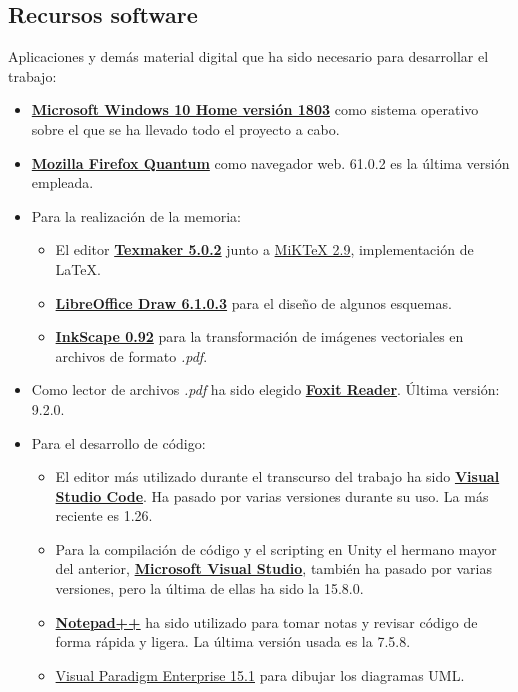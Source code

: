\subsection{Recursos software}
Aplicaciones y demás material digital que ha sido necesario para desarrollar el trabajo:
\begin{itemize}
\item \href{https://www.microsoft.com/es-es/windows}{\textbf{Microsoft Windows 10 Home versión 1803}} como sistema operativo sobre el que se ha llevado todo el proyecto a cabo.
\item \href{https://www.mozilla.org/es-ES/firefox/}{\textbf{Mozilla Firefox Quantum}} como navegador web. 61.0.2 es la última versión empleada.
\item Para la realización de la memoria:
\begin{itemize}
\item El editor \href{http://www.xm1math.net/texmaker/}{\textbf{Texmaker 5.0.2}} junto a \href{https://miktex.org/about}{MiKTeX 2.9}, implementación de \LaTeX.
\item \href{https://es.libreoffice.org/descubre/draw/}{\textbf{LibreOffice Draw 6.1.0.3}} para el diseño de algunos esquemas.
\item \href{https://inkscape.org/es/}{\textbf{InkScape 0.92}} para la transformación de imágenes vectoriales en archivos de formato \textit{.pdf}.
\end{itemize}
\item Como lector de archivos \textit{.pdf} ha sido elegido \href{https://www.foxitsoftware.com/pdf-reader/}{\textbf{Foxit Reader}}. Última versión: 9.2.0.
\item Para el desarrollo de código:
\begin{itemize}
\item El editor más utilizado durante el transcurso del trabajo ha sido \href{https://code.visualstudio.com/}{\textbf{Visual Studio Code}}. Ha pasado por varias versiones durante su uso. La más reciente es 1.26.
\item Para la compilación de código y el scripting en Unity el hermano mayor del anterior, \href{https://visualstudio.microsoft.com/es/}{\textbf{Microsoft Visual Studio}}, también ha pasado por varias versiones, pero la última de ellas ha sido la 15.8.0.
\item \href{https://notepad-plus-plus.org/}{\textbf{Notepad++}} ha sido utilizado para tomar notas y revisar código de forma rápida y ligera. La última versión usada es la 7.5.8.
\item \href{https://www.visual-paradigm.com/}{Visual Paradigm Enterprise 15.1} para dibujar los diagramas UML.

\end{itemize}
\end{itemize}
